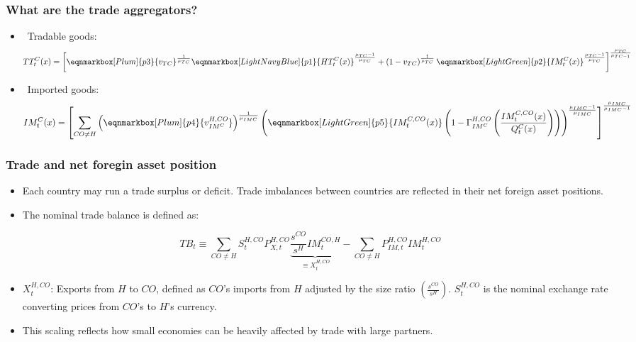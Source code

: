 \documentclass[british,english,aspectratio=169]{beamer}
\begin{document}
  \begin{frame}
    \frametitle{What are the trade aggregators?}
    \begin{itemize}
    \item \faBoxes~Tradable goods: %
    \begin{equation*}
    TT_t^C(x)=\left[\eqnmarkbox[Plum]{p3}{v_{TC}}^{\frac{1}{\mu_{TC}}} \eqnmarkbox[LightNavyBlue]{p1}{HT_t^C(x)}^{\frac{\mu_{TC}-1}{\mu_{TC}}}+\left(1-v_{TC}\right)^{\frac{1}{\mu_{TC}}} \eqnmarkbox[LightGreen]{p2}{IM_t^C(x)}^{\frac{\mu_{TC}-1}{\mu_{TC}}}\right]^{\frac{\mu_{TC}}{\mu_{TC-1}}}
    \end{equation*}
    \item \faShip~Imported goods: %
    {\small
    \begin{equation*}
    IM_t^C(x)=\left[\sum_{CO \neq H}\left(\eqnmarkbox[Plum]{p4}{v_{IM^C}^{H,CO}}\right)^{\frac{1}{\mu_{IMC}}}\left(\eqnmarkbox[LightGreen]{p5}{IM_t^{C,CO}(x)}\left(1-\Gamma_{IM^C}^{H,CO}\left(\frac{IM_t^{C,CO}(x)}{Q_t^C(x)}\right)\right)\right)^{\frac{\mu_{IMC}-1}{\mu_{IMC}}}\right]^{\frac{\mu_{IMC}}{\mu_{IMC}-1}}
    \end{equation*}
    }
    \end{itemize}
    \end{frame}

\begin{frame}
  \frametitle{Trade and net foregin asset position}
\begin{itemize}
  \item Each country may run a trade surplus or deficit. Trade imbalances between countries are reflected in their net foreign asset positions.
  \item The nominal trade balance is defined as:
\end{itemize}

\vspace{2mm}
\begin{equation*}
  TB_t \equiv \sum_{CO \neq H} S_t^{H,CO} P_{X,t}^{H,CO} \underbrace{\frac{s^{CO}}{s^H} IM_t^{CO,H}}_{\equiv X_t^{H,CO}} - \sum_{CO \neq H} P_{IM,t}^{H,CO} IM_t^{H,CO}
\end{equation*}

\vspace{2mm}
\begin{itemize}
  \item $X_t^{H,CO}$: Exports from $H$ to $CO$, defined as $CO$'s imports from $H$ adjusted by the size ratio $\left(\frac{s^{CO}}{s^H}\right)$. $S_t^{H,CO}$ is the nominal exchange rate converting prices from $CO$'s to $H$'s currency.
  \item This scaling reflects how small economies can be heavily affected by trade with large partners.
\end{itemize}
\end{frame}
\end{document}
